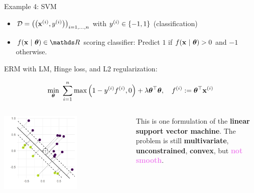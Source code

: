 \begin{vbframe}{Example 4: SVM}

\begin{footnotesize}
\begin{itemize}
	\item $\mathcal{D} = \left(\left(\mathbf{x}^{(i)}, y^{(i)}\right)\right)_{i = 1, ..., n}$ with $y^{(i)} \in \{-1, 1\}$ (classification)
	\item $\fxt \in \R$ scoring classifier: Predict $1$ if $f(\mathbf{x} ~|~ \bm{\theta}) > 0$ and $-1$ otherwise. 
\end{itemize}
\end{footnotesize}

ERM with LM, Hinge loss, and L2 regularization: 

$$
	\min_{\bm{\theta}} ~\sum\limits_{i=1}^n \max\left(1 - y^{(i)} f^{(i)}, 0\right) + \lambda \bm{\theta}^\top \bm{\theta}, \quad f^{(i)} := \bm{\theta}^\top \mathbf{x}^{(i)}
$$

\vspace*{-0.2cm}

\begin{columns}[T] %
	\begin{column}{.58\textwidth}
		\begin{center}
			\includegraphics[width=0.6\textwidth]{figure_man/svm_geometry.png} 
		\end{center}
	\end{column}
	\begin{column}{.38\textwidth} \vspace*{1.5cm}
		\begin{footnotesize}
		This is one formulation of the \textbf{linear support vector machine}. The problem is still \textbf{multivariate}, \textbf{unconstrained}, \textbf{convex}, but \textcolor{violet}{\textbf{not smooth}}.  
		\end{footnotesize}
	\end{column}
\end{columns}


\end{vbframe}
